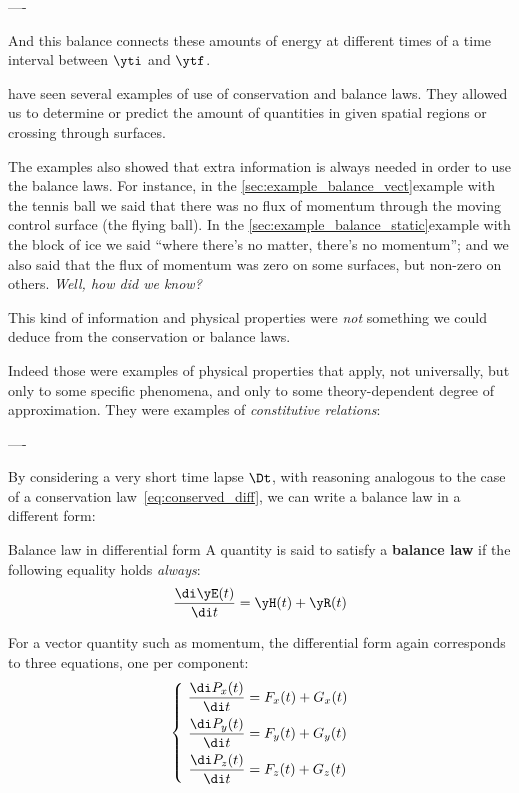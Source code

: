 ----

And this balance connects these amounts of energy at different times of a time interval between $\yti$ and $\ytf$.


have seen several examples of use of conservation and balance laws. They allowed us to determine or predict the amount of quantities in given spatial regions or crossing through surfaces.

The examples also showed that extra information is always needed in order to use the balance laws. For instance, in the \autoref{sec:example_balance_vect}{example with the tennis ball} we said that there was no flux of momentum through the moving control surface (the flying ball). In the \autoref{sec:example_balance_static}{example with the block of ice} we said \enquote{where there's no matter, there's no momentum}; and we also said that the flux of momentum was zero on some surfaces, but non-zero on others.
\emph{Well, how did we know?}

This kind of information and physical properties were \emph{not} something we could deduce from the conservation or balance laws.

Indeed those were examples of physical properties that apply, not universally, but only to some specific phenomena, and only to some theory-dependent degree of approximation. They were examples of \emph{constitutive relations}:


----


By considering a very short time lapse $\Dt$, with reasoning analogous to the case of a conservation law~\eqref{eq:conserved_diff}, we can write a balance law in a different form:
\begin{definition}{Balance law in differential form}
  A quantity is said to satisfy a \textbf{balance law} if the following equality holds \emph{always}:
  \begin{equation}
    \label{eq:balance_diff}
    \frac{\di\yE(t)}{\di t} = \yH(t) + \yR(t)
  \end{equation}

  For a vector quantity such as momentum, the differential form again corresponds to three equations, one per component:
\begin{equation}
      \label{eq:balance_diff_components}
\left\{\   \begin{aligned}
    \frac{\di P_{x}(t)}{\di t} &= F_{x}(t) + G_{x}(t)
\\
    \frac{\di P_{y}(t)}{\di t} &= F_{y}(t) + G_{y}(t)
\\
    \frac{\di P_{z}(t)}{\di t} &= F_{z}(t) + G_{z}(t)
  \end{aligned}\right.
\end{equation}
\end{definition}



